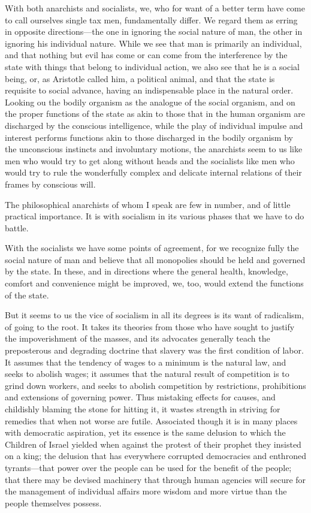 \documentclass{book}
\begin{document}
With both anarchists and socialists, we, who for want of a better term have come to call ourselves single tax men, fundamentally differ. We regard them as erring in opposite directions—the one in ignoring the social nature of man, the other in ignoring his individual nature. While we see that man is primarily an individual, and that nothing but evil has come or can come from the interference by the state with things that belong to individual action, we also see that he is a social being, or, as Aristotle called him, a political animal, and that the state is requisite to social advance, having an indispensable place in the natural order. Looking ou the bodily organism as the analogue of the social organism, and on the proper functions of the state as akin to those that in the human organism are discharged by the conscious intelligence, while the play of individual impulse and interest performs functions akin to those discharged in the bodily organism by the unconscious instincts and involuntary motions, the anarchists seem to us like men who would try to get along without heads and the socialists like men who would try to rule the wonderfully complex and delicate internal relations of their frames by conscious will.

The philosophical anarchists of whom I speak are few in number, and of little practical importance. It is with socialism in its various phases that we have to do battle.

With the socialists we have some points of agreement, for we recognize fully the social nature of man and believe that all monopolies should be held and governed by the state. In these, and in directions where the general health, knowledge, comfort and convenience might be improved, we, too, would extend the functions of the state.

But it seems to us the vice of socialism in all its degrees is its want of radicalism, of going to the root. It takes its theories from those who have sought to justify the impoverishment of the masses, and its advocates generally teach the preposterous and degrading doctrine that slavery was the first condition of labor. It assumes that the tendency of wages to a minimum is the natural law, and seeks to abolish wages; it assumes that the natural result of competition is to grind down workers, and seeks to abolish competition by restrictions, prohibitions and extensions of governing power. Thus mistaking effects for causes, and childishly blaming the stone for hitting it, it wastes strength in striving for remedies that when not worse are futile. Associated though it is in many places with democratic aspiration, yet its essence is the same delusion to which the Children of Israel yielded when against the protest of their prophet they insisted on a king; the delusion that has everywhere corrupted democracies and enthroned tyrants—that power over the people can be used for the benefit of the people; that there may be devised machinery that through human agencies will secure for the management of individual affairs more wisdom and more virtue than the people themselves possess.
\end{document}
